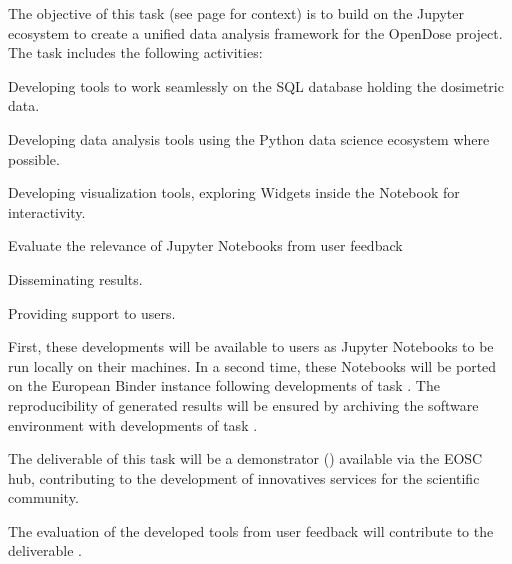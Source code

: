 \begin{task}[
  title=Demonstrator: Nuclear Medicine,
  id=opendose-analysis,
  lead=INSERM,
  PM=22,
  wphases={3-33},
  partners={EGI,XFEL}
]


  The objective of this task (see page
  \pageref{sec:concept-demonstrators-opendose} for context)
  is to build on the Jupyter ecosystem to create a
  unified data analysis framework for the OpenDose project.
  The task includes the following activities:
  \begin{compactitem}
  \item Developing tools to work seamlessly on the SQL database holding the
    dosimetric data.
  \item Developing data analysis tools using the Python data science ecosystem
    where possible.
  \item Developing visualization tools, exploring Widgets inside the Notebook
    for interactivity.
  \item Evaluate the relevance of Jupyter Notebooks from user feedback
  \item Disseminating results.
  \item Providing support to users.
  \end{compactitem}
  First, these developments will be available to users as Jupyter Notebooks to
  be run locally on their machines. In a second time, these Notebooks will be
  ported on the European Binder instance following developments of task
  . The reproducibility of generated results will be
  ensured by archiving the software environment with developments of task
  .

  The deliverable of this task will be a demonstrator
  () available via the EOSC hub, contributing
  to the development of innovatives services for the scientific community.

  The evaluation of the developed tools from user feedback will contribute to
  the deliverable .

\end{task}
